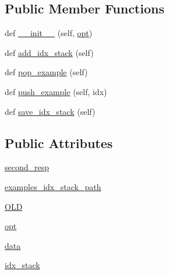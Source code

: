 \subsection*{Public Member Functions}
\begin{DoxyCompactItemize}
\item 
def \hyperlink{classimage__chat__collection_1_1worlds_1_1ExampleGenerator_a17074787229ef3b12887fa756832d45a}{\+\_\+\+\_\+init\+\_\+\+\_\+} (self, \hyperlink{classimage__chat__collection_1_1worlds_1_1ExampleGenerator_af81b2df2aa075818decf714b0194d908}{opt})
\item 
def \hyperlink{classimage__chat__collection_1_1worlds_1_1ExampleGenerator_aa2cc3ca44d92a3aa6a75cb4a4194f4dd}{add\+\_\+idx\+\_\+stack} (self)
\item 
def \hyperlink{classimage__chat__collection_1_1worlds_1_1ExampleGenerator_a483f70c4d3d3643b180f4a37b204f586}{pop\+\_\+example} (self)
\item 
def \hyperlink{classimage__chat__collection_1_1worlds_1_1ExampleGenerator_a417989f9fbc86367d9e4d1a52486db80}{push\+\_\+example} (self, idx)
\item 
def \hyperlink{classimage__chat__collection_1_1worlds_1_1ExampleGenerator_ad50213021a72919682cbca2a274d0c4c}{save\+\_\+idx\+\_\+stack} (self)
\end{DoxyCompactItemize}
\subsection*{Public Attributes}
\begin{DoxyCompactItemize}
\item 
\hyperlink{classimage__chat__collection_1_1worlds_1_1ExampleGenerator_a1567fe5f2514d3ca587135876f662c91}{second\+\_\+resp}
\item 
\hyperlink{classimage__chat__collection_1_1worlds_1_1ExampleGenerator_ae72fb9efc3997a261057fad00bc3848c}{examples\+\_\+idx\+\_\+stack\+\_\+path}
\item 
\hyperlink{classimage__chat__collection_1_1worlds_1_1ExampleGenerator_a900a30f201c1cb5b76cbfbd4de169c1b}{O\+LD}
\item 
\hyperlink{classimage__chat__collection_1_1worlds_1_1ExampleGenerator_af81b2df2aa075818decf714b0194d908}{opt}
\item 
\hyperlink{classimage__chat__collection_1_1worlds_1_1ExampleGenerator_a3e87cde07e69d44a919a90690aab456a}{data}
\item 
\hyperlink{classimage__chat__collection_1_1worlds_1_1ExampleGenerator_af50982bf2fe045e42d6d17374300c557}{idx\+\_\+stack}
\end{DoxyCompactItemize}


